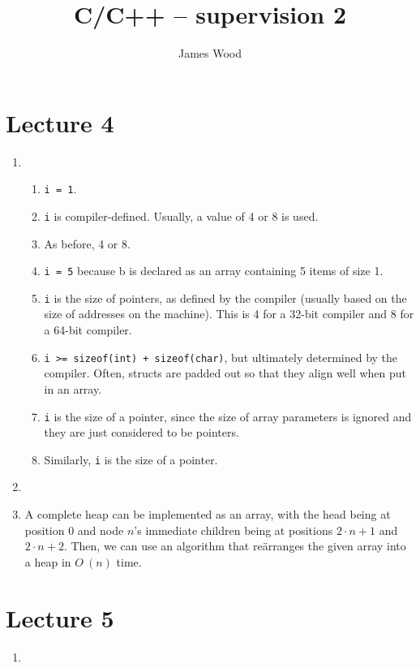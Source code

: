 \documentclass{article}
\begin{document}
\title{C/C++ -- supervision 2}
\author{James Wood}
\maketitle

\section{Lecture 4}
\begin{enumerate}
  \item
    \begin{enumerate}
      \item \texttt{i = 1}.
      \item \texttt{i} is compiler-defined. Usually, a value of 4 or 8 is used.
      \item As before, 4 or 8.
      \item \texttt{i = 5} because b is declared as an array containing 5 items of size 1.
      \item \texttt{i} is the size of pointers, as defined by the compiler (usually based on the size of addresses on the machine). This is 4 for a 32-bit compiler and 8 for a 64-bit compiler.
      \item \texttt{i >= sizeof(int) + sizeof(char)}, but ultimately determined by the compiler. Often, structs are padded out so that they align well when put in an array.
      \item \texttt{i} is the size of a pointer, since the size of array parameters is ignored and they are just considered to be pointers.
      \item Similarly, \texttt{i} is the size of a pointer.
    \end{enumerate}
  \item 
  \item A complete heap can be implemented as an array, with the head being at position $0$ and node $n$'s immediate children being at positions $2 \cdot n + 1$ and $2 \cdot n + 2$. Then, we can use an algorithm that re\"arranges the given array into a heap in $O~(n)$ time.
\end{enumerate}

\section{Lecture 5}
\begin{enumerate}
  \item 
\end{enumerate}
\end{document}
